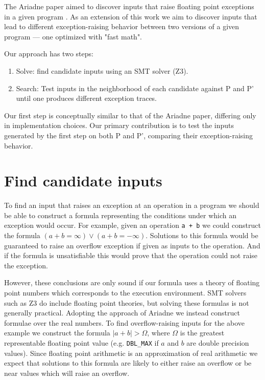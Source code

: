 \documentclass{article}
\begin{document}
The Ariadne paper aimed to discover inputs that raise floating point exceptions
in a given program \cite{barr_automatic_2013}. As an extension of this work we
aim to discover inputs that lead to different exception-raising behavior between
two versions of a given program — one optimized with "fast math".

Our approach has two steps:
\begin{enumerate}
  \item Solve: find candidate inputs using an SMT solver (Z3).
  \item Search: Test inputs in the neighborhood of each candidate against P and
P' until one produces different exception traces.
\end{enumerate}

Our first step is conceptually similar to that of the Ariadne paper, differing
only in implementation choices. Our primary contribution is to test the inputs
generated by the first step on both P and P', comparing their exception-raising
behavior.

\section{Find candidate inputs}

To find an input that raises an exception at an operation in a program we should
be able to construct a formula representing the conditions under which an
exception would occur. For example, given an operation \texttt{a + b} we could
construct the formula $(a + b = \infty) \lor (a + b = -\infty)$. Solutions to
this formula would be guaranteed to raise an overflow exception if given as
inputs to the operation. And if the formula is unsatisfiable this would prove
that the operation could not raise the exception.

However, these conclusions are only sound if our formula uses a theory of
floating point numbers which corresponds to the execution environment. SMT
solvers such as Z3 do include floating point theories, but solving these
formulas is not generally practical. Adopting the approach of Ariadne we instead
construct formulae over the real numbers. To find overflow-raising inputs for
the above example we construct the formula $|a + b| > \Omega$, where $\Omega$ is
the greatest representable floating point value (e.g. \texttt{DBL\_MAX} if $a$
and $b$ are double precision values). Since floating point arithmetic is an
approximation of real arithmetic we expect that solutions to this formula are
likely to either raise an overflow or be near values which will raise an
overflow.
\end{document}
